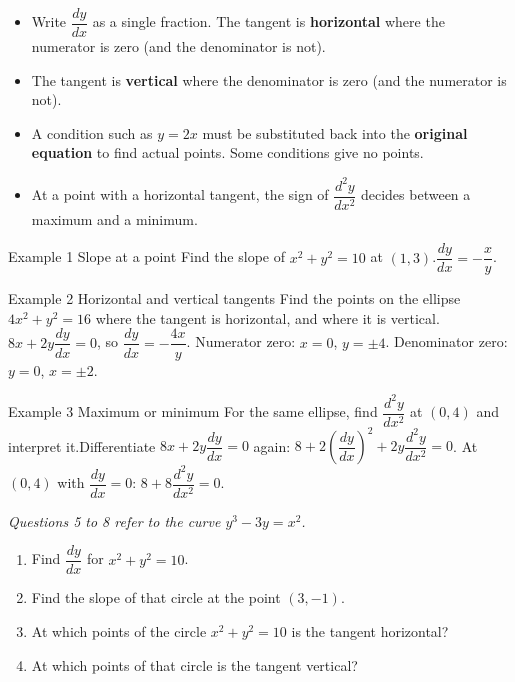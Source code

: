 \documentclass[11pt]{article}
\begin{document}

\begin{ideabox}
\begin{itemize}[leftmargin=*,itemsep=2pt,topsep=2pt]
  \item Write $\dfrac{dy}{dx}$ as a single fraction. The tangent is \textbf{horizontal} where the numerator is zero (and the denominator is not).
  \item The tangent is \textbf{vertical} where the denominator is zero (and the numerator is not).
  \item A condition such as $y=2x$ must be substituted back into the \textbf{original equation} to find actual points. Some conditions give no points.
  \item At a point with a horizontal tangent, the sign of $\dfrac{d^2y}{dx^2}$ decides between a maximum and a minimum.
\end{itemize}
\end{ideabox}

\begin{example}{Example 1 \textperiodcentered{} Slope at a point}
Find the slope of $x^2+y^2=10$ at $(1,3)$.\soln $\dfrac{dy}{dx}=-\dfrac xy$.
\end{example}

\begin{example}{Example 2 \textperiodcentered{} Horizontal and vertical tangents}
Find the points on the ellipse $4x^2+y^2=16$ where the tangent is horizontal, and where it is vertical.\soln $8x+2y\dfrac{dy}{dx}=0$, so $\dfrac{dy}{dx}=-\dfrac{4x}{y}$. Numerator zero: $x=0$, $y=\pm4$. Denominator zero: $y=0$, $x=\pm2$.
\end{example}

\begin{example}{Example 3 \textperiodcentered{} Maximum or minimum}
For the same ellipse, find $\dfrac{d^2y}{dx^2}$ at $(0,4)$ and interpret it.\soln Differentiate $8x+2y\dfrac{dy}{dx}=0$ again: $8+2\left(\dfrac{dy}{dx}\right)^2+2y\dfrac{d^2y}{dx^2}=0$. At $(0,4)$ with $\dfrac{dy}{dx}=0$: $8+8\dfrac{d^2y}{dx^2}=0$.
\end{example}

\newpage
{}
\emph{Questions 5 to 8 refer to the curve $y^3-3y=x^2$.}
\begin{enumerate}[leftmargin=*,itemsep=2pt]
  \item Find $\dfrac{dy}{dx}$ for $x^2+y^2=10$.\work{2.3cm}
  \item Find the slope of that circle at the point $(3,-1)$.\work{2.3cm}
  \item At which points of the circle $x^2+y^2=10$ is the tangent horizontal?\work{2.3cm}
  \item At which points of that circle is the tangent vertical?\work{2.3cm}
\end{enumerate}
\end{document}
